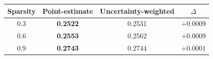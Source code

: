 \begin{tabular}{cccc}
\toprule
Sparsity & Point-estimate & Uncertainty-weighted & $\Delta$ \\
\midrule
0.3 & \textbf{0.2522} & 0.2531 & $+0.0009$ \\
0.6 & \textbf{0.2553} & 0.2562 & $+0.0009$ \\
0.9 & \textbf{0.2743} & 0.2744 & $+0.0001$ \\
\bottomrule
\end{tabular}
